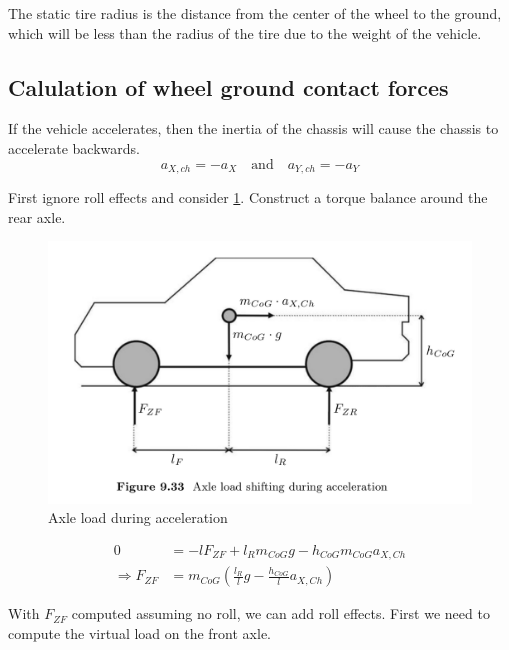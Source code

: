 The static tire radius is the distance from the center of the wheel to the ground, which will be less than the radius of the tire due to the weight of the vehicle.


\subsection{Calulation of wheel ground contact forces}

If the vehicle accelerates, then the inertia of the chassis will cause the chassis to accelerate backwards. 
\begin{equation}
  a_{X,ch} = -a_X
  \quad \text{and} \quad
  a_{Y,ch} = -a_Y
\end{equation}


First ignore roll effects and consider \cref{fig:axle-load-during-acceleration}. Construct a torque balance around the rear axle. 

\begin{figure}
    \centering
    \includegraphics[width=\textwidth]{draft/stolen-figures/axle-load-during-acceleration.png}
    \caption{Axle load during acceleration}
    \label{fig:axle-load-during-acceleration}
\end{figure}

\begin{align}
  0 &= - l F_{ZF} + l_R m_{CoG} g - h_{CoG} m_{CoG} a_{X,Ch} \\
  \Rightarrow F_{ZF} &= m_{CoG} \left( \frac{l_R}{l}g - \frac{h_{CoG}}{l} a_{X,Ch} \right)
\end{align}

With $F_{ZF}$ computed assuming no roll, we can add roll effects. First we need to compute the virtual load on the front axle.

